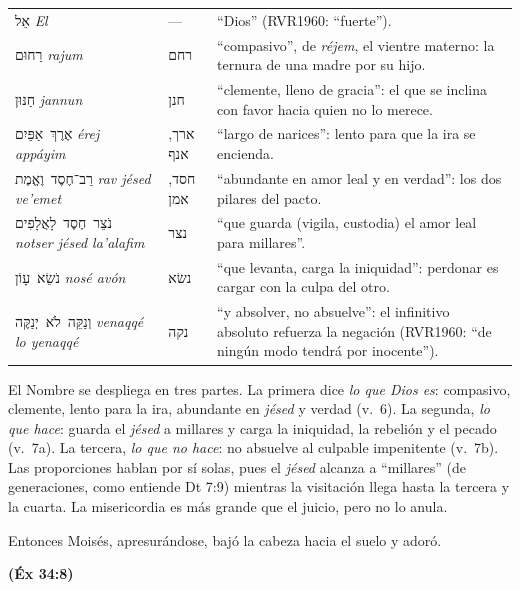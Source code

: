 \documentclass[11pt,letterpaper]{article}
\newcommand{\heb}[1]{\mbox{\foreignlanguage{hebrew}{#1}}}
\newcommand{\fuente}[1]{\par\hfill{\upshape\bfseries\small\textcolor{azul}{#1}}}
\begin{document}
\begin{filologia}[Éx 34:6--7]
\begin{tabular}{@{}L{3.2cm}L{1.6cm}L{10cm}@{}}
\heb{אֵל} \emph{El} & --- & ``Dios'' (RVR1960: ``fuerte''). \\[2pt]
\heb{רַחוּם} \emph{rajum} & \heb{רחם} & ``compasivo'', de \emph{réjem}, el vientre materno: la ternura de una madre por su hijo. \\[2pt]
\heb{חַנּוּן} \emph{jannun} & \heb{חנן} & ``clemente, lleno de gracia'': el que se inclina con favor hacia quien no lo merece. \\[2pt]
\heb{אֶרֶךְ אַפַּיִם} \emph{érej appáyim} & \heb{ארך}, \heb{אנף} & ``largo de narices'': lento para que la ira se encienda. \\[2pt]
\heb{רַב־חֶסֶד וֶאֱמֶת} \emph{rav jésed ve'emet} & \heb{חסד}, \heb{אמן} & ``abundante en amor leal y en verdad'': los dos pilares del pacto. \\[2pt]
\heb{נֹצֵר חֶסֶד לָאֲלָפִים} \emph{notser jésed la'alafim} & \heb{נצר} & ``que guarda (vigila, custodia) el amor leal para millares''. \\[2pt]
\heb{נֹשֵׂא עָוֹן} \emph{nosé avón} & \heb{נשׂא} & ``que levanta, carga la iniquidad'': perdonar es cargar con la culpa del otro. \\[2pt]
\heb{וְנַקֵּה לֹא יְנַקֶּה} \emph{venaqqé lo yenaqqé} & \heb{נקה} & ``y absolver, no absuelve'': el infinitivo absoluto refuerza la negación (RVR1960: ``de ningún modo tendrá por inocente''). \\
\end{tabular}
\end{filologia}

El Nombre se despliega en tres partes. La primera dice \emph{lo que Dios es}: compasivo, clemente, lento para la ira, abundante en \emph{jésed} y verdad (v.~6). La segunda, \emph{lo que hace}: guarda el \emph{jésed} a millares y carga la iniquidad, la rebelión y el pecado (v.~7a). La tercera, \emph{lo que no hace}: no absuelve al culpable impenitente (v.~7b). Las proporciones hablan por sí solas, pues el \emph{jésed} alcanza a ``millares'' (de generaciones, como entiende Dt 7:9) mientras la visitación llega hasta la tercera y la cuarta. La misericordia es más grande que el juicio, pero no lo anula.

\begin{cita}Entonces Moisés, apresurándose, bajó la cabeza hacia el suelo y adoró.\fuente{(Éx 34:8)}\end{cita}
\end{document}
